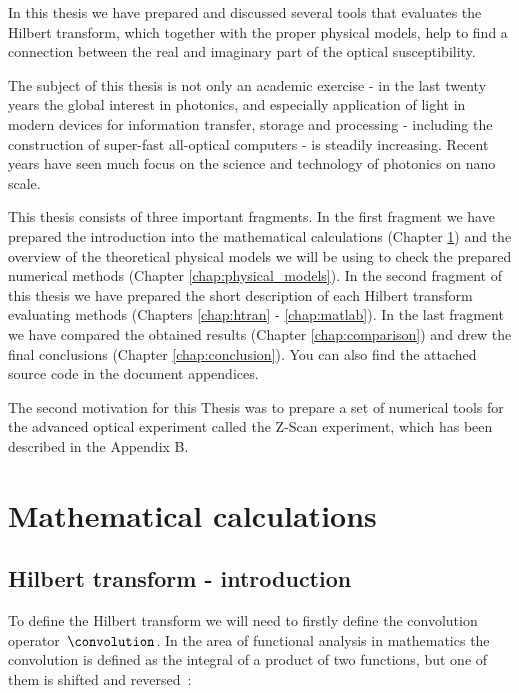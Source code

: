 \documentclass[12pt,twoside,a4paper]{article}
\numberwithin{equation}{subsection}
\numberwithin{figure}{subsection}
\begin{document}
In this thesis we have prepared and discussed several tools that evaluates the Hilbert transform, which together with the proper physical
models, help to find a connection between the real and imaginary part of the optical susceptibility.   

The subject of this thesis is not only an academic exercise - in the last twenty years the global interest in photonics, and
especially application of light in modern devices for information transfer, storage and processing - including the construction of super-fast
all-optical computers - is steadily increasing. Recent years have seen much focus on the science and technology of photonics on
nano scale. 

This thesis consists of three important fragments. In the first fragment we have prepared the introduction into the mathematical calculations
(Chapter \ref{chap:mathematical_calculations}) and the overview of the theoretical physical models we will be using to check the
prepared numerical methods (Chapter \ref{chap:physical_models}). In the second fragment of this thesis we have prepared the short description of
each Hilbert transform evaluating methods (Chapters \ref{chap:htran} - \ref{chap:matlab}). In the last fragment we have compared the obtained
results (Chapter \ref{chap:comparison}) and drew the final conclusions (Chapter \ref{chap:conclusion}). You can also find the attached
source code in the document appendices.

The second motivation for this Thesis was to prepare a set of numerical tools for the advanced optical experiment called the
Z-Scan experiment, which has been described in the Appendix B.

\section{Mathematical calculations} \label{chap:mathematical_calculations}

\subsection{Hilbert transform - introduction}  \label{chap:mathematical_hilbert}

To define the Hilbert transform we will need to firstly define the convolution operator~$\convolution$. In the area of functional analysis
in mathematics the convolution is defined as the integral of a product of two functions, but one of them is shifted and
reversed~\cite{bracewell_fourier}:
\end{document}
